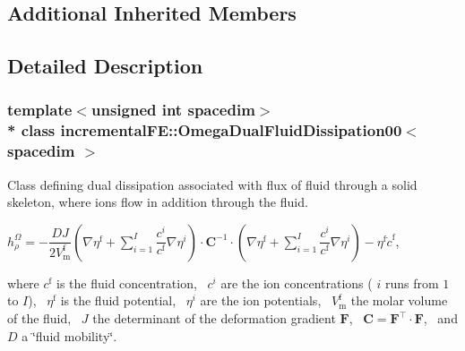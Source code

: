 \subsection*{Additional Inherited Members}


\subsection{Detailed Description}
\subsubsection*{template$<$unsigned int spacedim$>$\\*
class incremental\+F\+E\+::\+Omega\+Dual\+Fluid\+Dissipation00$<$ spacedim $>$}

Class defining dual dissipation associated with flux of fluid through a solid skeleton, where ions flow in addition through the fluid.

$ h^\Omega_\rho = -\dfrac{D J}{2 V^\mathrm{f}_\mathrm{m}} \left(\nabla \eta^\mathrm{f} + \sum^I_{i=1} \dfrac{c^i}{c^\mathrm{f}} \nabla\eta^i \right) \cdot \boldsymbol{C}^{-1} \cdot \left(\nabla \eta^\mathrm{f} + \sum^I_{i=1} \dfrac{c^i}{c^\mathrm{f}} \nabla\eta^i \right) - \eta^\mathrm{f} \dot{c}^\mathrm{f}$,

where $c^\mathrm{f}$ is the fluid concentration,~\newline
 $c^i$ are the ion concentrations ( $i$ runs from $1$ to $I$),~\newline
 $\eta^\mathrm{f}$ is the fluid potential,~\newline
 $\eta^i$ are the ion potentials,~\newline
 $V^\mathrm{f}_\mathrm{m}$ the molar volume of the fluid,~\newline
 $J$ the determinant of the deformation gradient $\boldsymbol{F}$,~\newline
 $\boldsymbol{C} = \boldsymbol{F}^\top\cdot \boldsymbol{F}$,~\newline
 and $D$ a \char`\"{}fluid mobility\char`\"{}.


